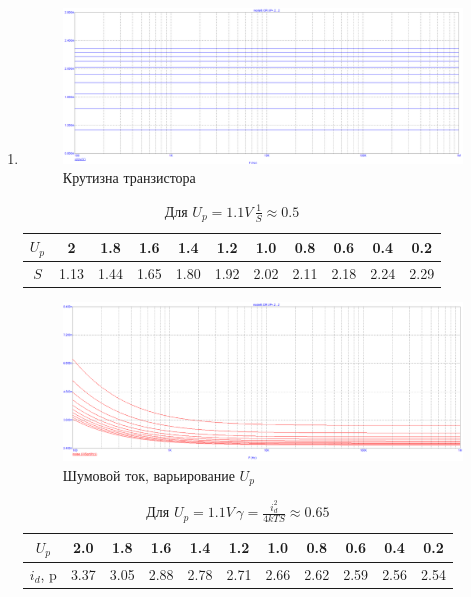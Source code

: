 \documentclass[a4paper, 12pt]{article}%
\begin{document}
\begin{enumerate}

\item

\FloatBarrier
\begin{figure}[h!]
    \centering
    \includegraphics[scale=0.3]{images/mod6_1_1.png}
    \caption{Крутизна транзистора}
    \label{fig:m611}
\end{figure}

\begin{center}
\begin{table}[h!]
    \centering
    \begin{tabular}{|c|c|c|c|c|c|c|c|c|c|c|}
    \hline
        $U_p$ & 2 & 1.8 & 1.6 & 1.4 & 1.2 & 1.0 & 0.8 & 0.6 & 0.4 & 0.2\\ \hline
        $S$ & 1.13 & 1.44 & 1.65 & 1.80 & 1.92 & 2.02 & 2.11 & 2.18 & 2.24 & 2.29 \\ \hline
    \end{tabular}
    \caption{Для $U_p = 1.1 V \, \frac{1}{S} \approx 0.5$}
    \label{tab:my_label}
\end{table}
\end{center}

\begin{figure}[h!]
    \centering
    \includegraphics[scale=0.3]{images/mod6_1_2.png}
    \caption{Шумовой ток, варьирование $U_p$}
    \label{fig:m612}
\end{figure}

\begin{center}
\begin{table}[h!]
    \centering
    \begin{tabular}{|c|c|c|c|c|c|c|c|c|c|c|}
    \hline
        $U_p$ & 2.0 & 1.8 & 1.6 & 1.4 & 1.2 & 1.0 & 0.8 & 0.6 & 0.4 & 0.2\\ \hline
        $i_d$, p & 3.37 & 3.05 & 2.88 & 2.78 & 2.71 & 2.66 & 2.62 & 2.59 & 2.56 & 2.54 \\ \hline
    \end{tabular}
    \caption{Для $U_p = 1.1 V\, \gamma = \frac{i_d^2}{4kTS} \approx 0.65$}
    \label{tab:mt612}
\end{table}
\end{center}


\end{enumerate}
\end{document}
